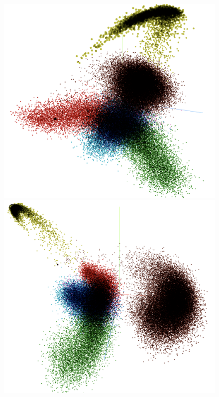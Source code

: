 \begin{figure}[H]
  \centering
  \begin{threeparttable}
  \begin{minipage}[b]{0.45\linewidth}
    \includegraphics[width=\textwidth]{figures_new/from_old/pca_embedding_projector}
  \end{minipage}
  \quad
  \begin{minipage}[b]{0.45\linewidth}
    \includegraphics[width=\textwidth]{figures_new/from_old/pca_embedding_projector_2}

\end{minipage}
\end{threeparttable}
\end{figure}
